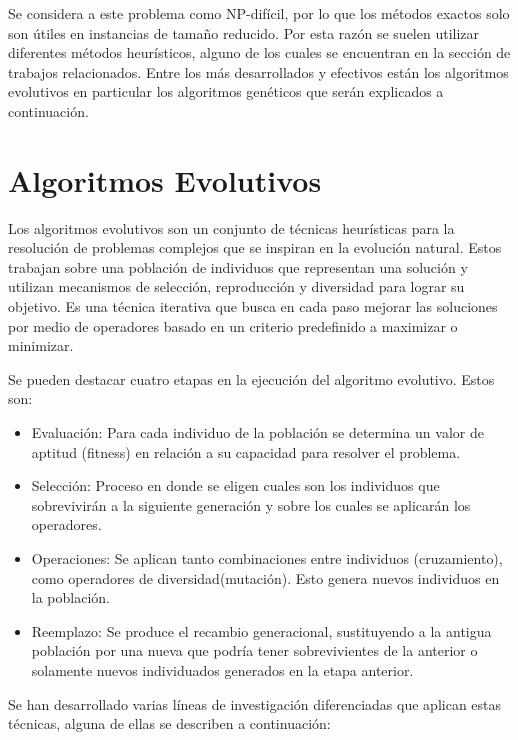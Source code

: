 Se considera a este problema como NP-difícil, por lo que los métodos exactos solo son útiles en instancias de tamaño reducido. Por esta razón se suelen utilizar diferentes métodos heurísticos, alguno de los cuales se encuentran en la sección de trabajos relacionados. Entre los más desarrollados y efectivos están los algoritmos evolutivos en particular los algoritmos genéticos que serán explicados a continuación.

\section{Algoritmos Evolutivos}

Los algoritmos evolutivos son un conjunto de técnicas heurísticas para la resolución de problemas complejos que se inspiran en la evolución natural. Estos trabajan sobre una población de individuos que representan una solución y utilizan mecanismos de selección, reproducción y diversidad para lograr su objetivo. 
Es una técnica iterativa que busca en cada paso mejorar las soluciones por medio de operadores basado en un criterio predefinido a maximizar o minimizar.

Se pueden destacar cuatro etapas en la ejecución del algoritmo evolutivo. Estos son:

\begin{itemize}
	\item Evaluación: Para cada individuo de la población se determina un valor de aptitud (fitness) en relación a su capacidad para resolver el problema. 
	\item Selección: Proceso en donde se eligen cuales son los individuos que sobrevivirán a la siguiente generación y sobre los cuales se aplicarán los operadores.
	\item Operaciones: Se aplican tanto combinaciones entre individuos (cruzamiento), como operadores de diversidad(mutación). Esto genera nuevos individuos en la población.
	\item Reemplazo: Se produce el recambio generacional, sustituyendo a la antigua población por una nueva que podría tener sobrevivientes de la anterior o solamente nuevos individuados generados en la etapa anterior.
\end{itemize}

Se han desarrollado varias líneas de investigación diferenciadas que aplican estas técnicas, alguna de ellas se describen a continuación:

